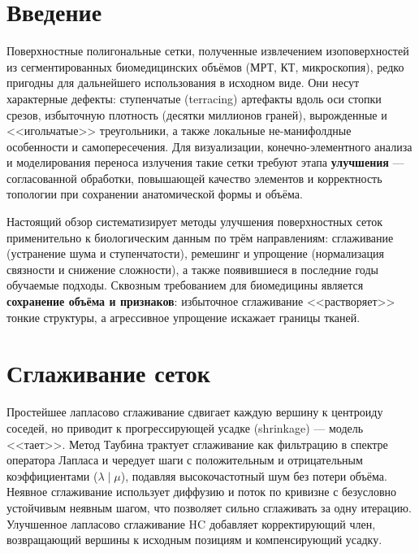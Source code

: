 \documentclass[a4paper,14pt]{article}
\begin{document}

\newpage

\section{Введение}

Поверхностные полигональные сетки, полученные извлечением изоповерхностей из сегментированных биомедицинских объёмов (МРТ, КТ, микроскопия), редко пригодны для дальнейшего использования в исходном виде. Они несут характерные дефекты: ступенчатые (terracing) артефакты вдоль оси стопки срезов, избыточную плотность (десятки миллионов граней), вырожденные и <<игольчатые>> треугольники, а также локальные не-манифолдные особенности и самопересечения. Для визуализации, конечно-элементного анализа и моделирования переноса излучения такие сетки требуют этапа \textbf{улучшения} --- согласованной обработки, повышающей качество элементов и корректность топологии при сохранении анатомической формы и объёма.

Настоящий обзор систематизирует методы улучшения поверхностных сеток применительно к биологическим данным по трём направлениям: сглаживание (устранение шума и ступенчатости), ремешинг и упрощение (нормализация связности и снижение сложности), а также появившиеся в последние годы обучаемые подходы. Сквозным требованием для биомедицины является \textbf{сохранение объёма и признаков}: избыточное сглаживание <<растворяет>> тонкие структуры, а агрессивное упрощение искажает границы тканей.

\section{Сглаживание сеток}

Простейшее лапласово сглаживание сдвигает каждую вершину к центроиду соседей, но приводит к прогрессирующей усадке (shrinkage) --- модель <<тает>>. Метод Таубина \cite{taubin1995} трактует сглаживание как фильтрацию в спектре оператора Лапласа и чередует шаги с положительным и отрицательным коэффициентами ($\lambda\!\mid\!\mu$), подавляя высокочастотный шум без потери объёма. Неявное сглаживание \cite{desbrun1999} использует диффузию и поток по кривизне с безусловно устойчивым неявным шагом, что позволяет сильно сглаживать за одну итерацию. Улучшенное лапласово сглаживание HC \cite{vollmer1999} добавляет корректирующий член, возвращающий вершины к исходным позициям и компенсирующий усадку.
\end{document}

